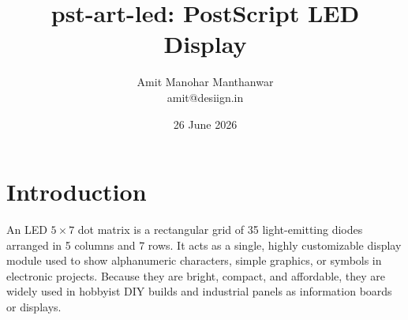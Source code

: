 \documentclass[11pt,a4paper]{pst-art}
\title{\textsf{pst-art-led}: PostScript LED Display}
\author{Amit Manohar Manthanwar\\[1mm]amit@desiign.in}
\date{26 June 2026}
\begin{document}
\tableofcontents
\printMetadata
\setlength{\parskip}{15pt}
\setlength{\baselineskip}{13pt}
\setlength{\LTpre}{10pt}%


\begin{figure}[!ht]
\centering%
\end{figure}


\section{Introduction}
An LED $5 \times 7$ dot matrix is a rectangular grid of 35 light-emitting diodes arranged in 5 columns and 7 rows. It acts as a single, highly customizable display module used to show alphanumeric characters, simple graphics, or symbols in electronic projects. Because they are bright, compact, and affordable, they are widely used in hobbyist DIY builds and industrial panels as information boards or displays.
\end{document}
